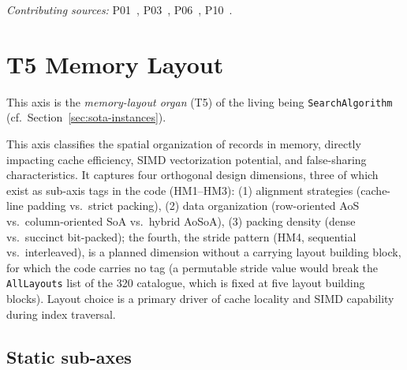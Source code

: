 \emph{Contributing sources:} P01~\cite{leis2013art}, P03~\cite{mao2012masstree}, P06~\cite{schmeisser2022b2tree}, P10~\cite{zhang2018surf}.

\section{T5 Memory Layout}

This axis is the \emph{memory-layout organ} (T5) of the living being \texttt{SearchAlgorithm} (cf.\ Section~\ref{sec:sota-instances}).

This axis classifies the spatial organization of records in memory, directly impacting cache efficiency, SIMD vectorization potential, and false-sharing characteristics. It captures four orthogonal design dimensions, three of which exist as sub-axis tags in the code (HM1--HM3): (1) alignment strategies (cache-line padding vs.\ strict packing), (2) data organization (row-oriented Ao\allowbreak{}S vs.\ column-oriented So\allowbreak{}A vs.\ hybrid Ao\allowbreak{}So\allowbreak{}A), (3) packing density (dense vs.\ succinct bit-packed); the fourth, the stride pattern (HM4, sequential vs.\ interleaved), is a planned dimension without a carrying layout building block, for which the code carries no tag (a permutable stride value would break the \texttt{All\allowbreak{}Layouts} list of the 320 catalogue, which is fixed at five layout building blocks). Layout choice is a primary driver of cache locality and SIMD capability during index traversal.

\subsection*{Static sub-axes}


